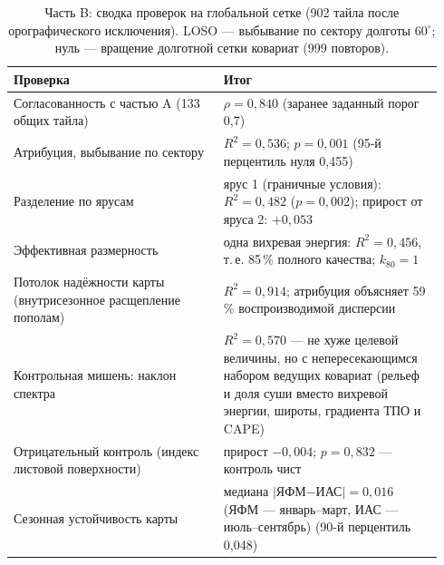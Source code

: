 \documentclass[11pt,a4paper]{article}
\begin{document}
\begin{table}[t]
\centering
\caption{Часть B: сводка проверок на глобальной сетке (902 тайла после орографического исключения). LOSO --- выбывание по сектору долготы $60^\circ$; нуль --- вращение долготной сетки ковариат (999 повторов).}
\label{tab:armB}
\small
\begin{tabular}{@{}p{0.46\linewidth}p{0.48\linewidth}@{}}
\toprule
Проверка & Итог\\
\midrule
Согласованность с частью A (133 общих тайла) & $\rho=0{,}840$ (заранее заданный порог 0,7)\\
Атрибуция, выбывание по сектору & $R^2=0{,}536$; $p=0{,}001$ (95-й перцентиль нуля 0,455)\\
Разделение по ярусам & ярус 1 (граничные условия): $R^2=0{,}482$ ($p=0{,}002$); прирост от яруса 2: $+0{,}053$\\
Эффективная размерность & одна вихревая энергия: $R^2=0{,}456$, т.\,е. 85\,\% полного качества; $k_{80}=1$\\
Потолок надёжности карты (внутрисезонное расщепление пополам) & $R^2=0{,}914$; атрибуция объясняет 59\,\% воспроизводимой дисперсии\\
Контрольная мишень: наклон спектра & $R^2=0{,}570$ --- не хуже целевой величины, но с непересекающимся набором ведущих ковариат (рельеф и доля суши вместо вихревой энергии, широты, градиента ТПО и CAPE)\\
Отрицательный контроль (индекс листовой поверхности) & прирост $-0{,}004$; $p=0{,}832$ --- контроль чист\\
Сезонная устойчивость карты & медиана $\lvert$ЯФМ$-$ИАС$\rvert=0{,}016$ (ЯФМ --- январь--март, ИАС --- июль--сентябрь) (90-й перцентиль 0,048)\\
\bottomrule
\end{tabular}
\end{table}
\end{document}
